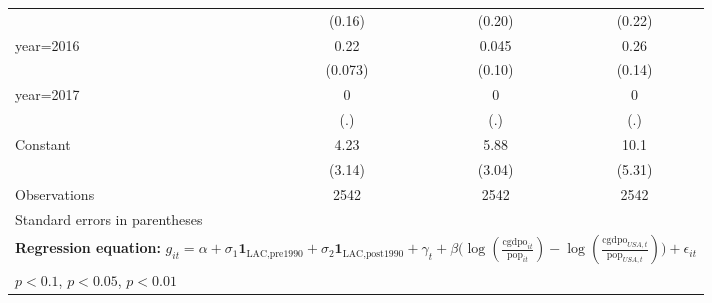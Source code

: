 \begin{sidewaystable}[htbp]
\begin{tabular}{l*{3}{c}}
                &   (0.16)         &   (0.20)         &   (0.22)         \\
\addlinespace
year=2016       &     0.22\sym{***}&    0.045         &     0.26\sym{*}  \\
                &  (0.073)         &   (0.10)         &   (0.14)         \\
\addlinespace
year=2017       &        0         &        0         &        0         \\
                &      (.)         &      (.)         &      (.)         \\
\addlinespace
Constant        &     4.23         &     5.88\sym{*}  &     10.1\sym{*}  \\
                &   (3.14)         &   (3.04)         &   (5.31)         \\
\midrule
Observations    &     2542         &     2542         &     2542         \\
\bottomrule
\multicolumn{4}{l}{\footnotesize Standard errors in parentheses}\\
\multicolumn{4}{l}{\footnotesize \textbf{Regression equation:} \(g_{it} = \alpha + \sigma_1 \mathbf{1}_{\textrm{LAC,pre1990}} + \sigma_2 \mathbf{1}_{\textrm{LAC,post1990}} + \gamma_t + \beta \big(\log (\frac{\textrm{cgdpo}_{it}}{\textrm{pop}_{it}} ) - \log (\frac{\textrm{cgdpo}_{USA,t}}{\textrm{pop}_{USA,t}}  ) \big) + \epsilon_{it}\)}\\
\multicolumn{4}{l}{\footnotesize \sym{*} \(p<0.1\), \sym{**} \(p<0.05\), \sym{***} \(p<0.01\)}\\
\end{tabular}
\end{sidewaystable}
